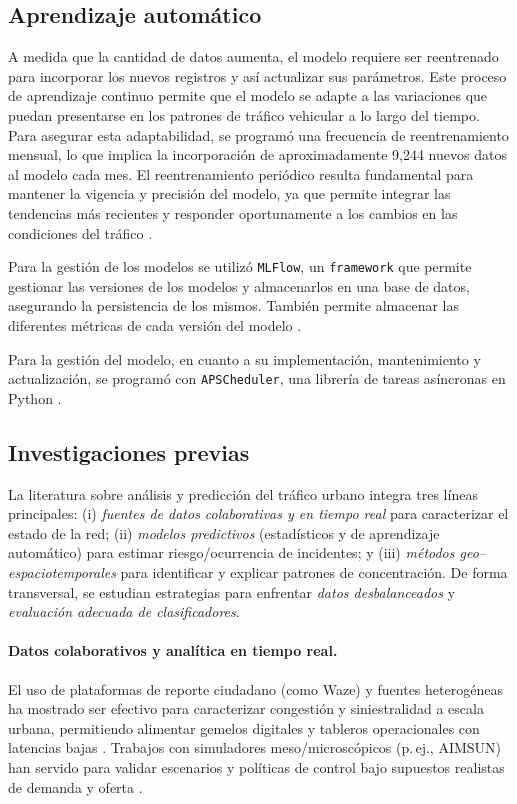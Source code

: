 \documentclass[12pt]{article}
\begin{document}
\subsection{Aprendizaje automático}

A medida que la cantidad de datos aumenta, el modelo requiere ser reentrenado para incorporar los nuevos registros y así actualizar sus parámetros. Este proceso de aprendizaje continuo permite que el modelo se adapte a las variaciones que puedan presentarse en los patrones de tráfico vehicular a lo largo del tiempo. Para asegurar esta adaptabilidad, se programó una frecuencia de reentrenamiento mensual, lo que implica la incorporación de aproximadamente 9,244 nuevos datos al modelo cada mes. El reentrenamiento periódico resulta fundamental para mantener la vigencia y precisión del modelo, ya que permite integrar las tendencias más recientes y responder oportunamente a los cambios en las condiciones del tráfico \parencite{gama2014concept}.


Para la gestión de los modelos se utilizó \texttt{MLFlow}, un \texttt{framework} que permite gestionar las versiones de los modelos y almacenarlos en una base de datos, asegurando la persistencia de los mismos. También permite almacenar las diferentes métricas de cada versión del modelo \parencite{mlflow2025}.

Para la gestión del modelo, en cuanto a su implementación, mantenimiento y actualización, se programó con \texttt{APSCheduler}, una librería de tareas asíncronas en Python \parencite{apscheduler2025}.

\subsection{Investigaciones previas}

La literatura sobre análisis y predicción del tráfico urbano integra tres líneas principales: (i) \textit{fuentes de datos colaborativas y en tiempo real} para caracterizar el estado de la red; (ii) \textit{modelos predictivos} (estadísticos y de aprendizaje automático) para estimar riesgo/ocurrencia de incidentes; y (iii) \textit{métodos geo–espaciotemporales} para identificar y explicar patrones de concentración. De forma transversal, se estudian estrategias para enfrentar \textit{datos desbalanceados} y \textit{evaluación adecuada de clasificadores}.

\paragraph{Datos colaborativos y analítica en tiempo real.}
El uso de plataformas de reporte ciudadano (como Waze) y fuentes heterogéneas ha mostrado ser efectivo para caracterizar congestión y siniestralidad a escala urbana, permitiendo alimentar gemelos digitales y tableros operacionales con latencias bajas \parencite{chen2015, ferreira2017waze, wazecitiescasestudies2024}. Trabajos con simuladores meso/microscópicos (p.\,ej., AIMSUN) han servido para validar escenarios y políticas de control bajo supuestos realistas de demanda y oferta \parencite{barcelo2005}.
\end{document}
